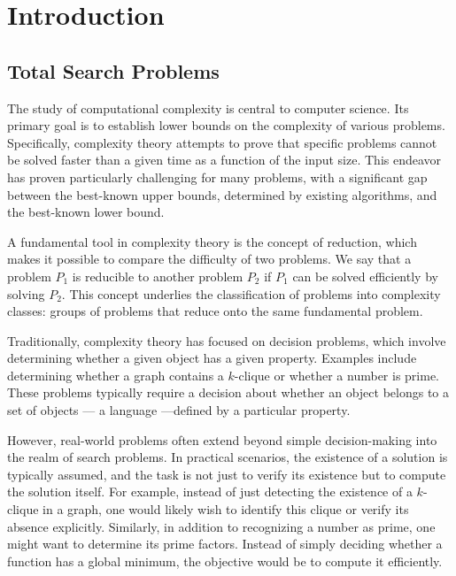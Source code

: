 \setchapterpreamble[u]{\margintoc}
\chapter{Introduction}

\section{Total Search Problems}

The study of computational complexity is central to computer science. Its primary goal is to establish lower bounds on the complexity of various problems. Specifically, complexity theory attempts to prove that specific problems cannot be solved faster than a given time as a function of the input size. This endeavor has proven particularly challenging for many problems, with a significant gap between the best-known upper bounds, determined by existing algorithms, and the best-known lower bound.

A fundamental tool in complexity theory is the concept of reduction, which makes it possible to compare the difficulty of two problems. We say that a problem $P_1$ is reducible to another problem $P_2$ if $P_1$ can be solved efficiently by solving $P_2$. This concept underlies the classification of problems into complexity classes: groups of problems that reduce onto the same fundamental problem.

Traditionally, complexity theory has focused on decision problems, which involve determining whether a given object has a given property. Examples include determining whether a graph contains a $k$-clique or whether a number is prime. These problems typically require a decision about whether an object belongs to a set of objects --- a language ---defined by a particular property.

However, real-world problems often extend beyond simple decision-making into the realm of search problems. In practical scenarios, the existence of a solution is typically assumed, and the task is not just to verify its existence but to compute the solution itself. For example, instead of just detecting the existence of a $k$-clique in a graph, one would likely wish to identify this clique or verify its absence explicitly. Similarly, in addition to recognizing a number as prime, one might want to determine its prime factors. Instead of simply deciding whether a function has a global minimum, the objective would be to compute it efficiently.

